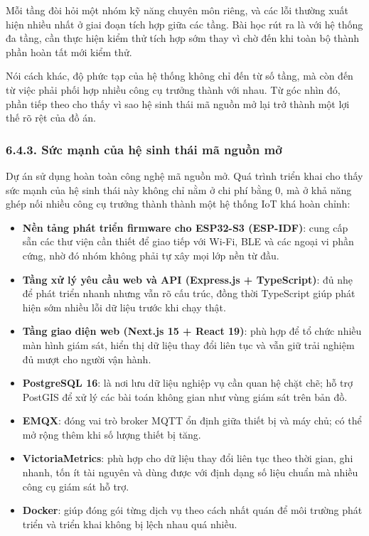 \documentclass[a4paper]{extarticle}
\providecommand{\tightlist}{%
  \setlength{\itemsep}{0pt}\setlength{\parskip}{0pt}}
\begin{document}
Mỗi tầng đòi hỏi một nhóm kỹ năng chuyên môn riêng, và các lỗi thường
xuất hiện nhiều nhất ở giai đoạn tích hợp giữa các tầng. Bài học rút ra
là với hệ thống đa tầng, cần thực hiện kiểm thử tích hợp sớm thay vì chờ
đến khi toàn bộ thành phần hoàn tất mới kiểm thử.

Nói cách khác, độ phức tạp của hệ thống không chỉ đến từ số tầng, mà còn
đến từ việc phải phối hợp nhiều công cụ trưởng thành với nhau. Từ góc
nhìn đó, phần tiếp theo cho thấy vì sao hệ sinh thái mã nguồn mở lại trở
thành một lợi thế rõ rệt của đồ án.

\subsubsection{6.4.3. Sức mạnh của hệ sinh thái mã nguồn
mở}\label{643-sux1ee9c-mux1ea1nh-cux1ee7a-hux1ec7-sinh-thuxe1i-muxe3-nguux1ed3n-mux1edf}

Dự án sử dụng hoàn toàn công nghệ mã nguồn mở. Quá trình triển khai cho
thấy sức mạnh của hệ sinh thái này không chỉ nằm ở chi phí bằng 0, mà ở
khả năng ghép nối nhiều công cụ trưởng thành thành một hệ thống IoT khá
hoàn chỉnh:

\begin{itemize}
\tightlist
\item
  \textbf{Nền tảng phát triển firmware cho ESP32-S3 (ESP-IDF)}: cung cấp
  sẵn các thư viện cần thiết để giao tiếp với Wi-Fi, BLE và các ngoại vi
  phần cứng, nhờ đó nhóm không phải tự xây mọi lớp nền từ đầu.
\item
  \textbf{Tầng xử lý yêu cầu web và API (Express.js + TypeScript)}: đủ
  nhẹ để phát triển nhanh nhưng vẫn rõ cấu trúc, đồng thời TypeScript
  giúp phát hiện sớm nhiều lỗi dữ liệu trước khi chạy thật.
\item
  \textbf{Tầng giao diện web (Next.js 15 + React 19)}: phù hợp để tổ
  chức nhiều màn hình giám sát, hiển thị dữ liệu thay đổi liên tục và
  vẫn giữ trải nghiệm đủ mượt cho người vận hành.
\item
  \textbf{PostgreSQL 16}: là nơi lưu dữ liệu nghiệp vụ cần quan hệ chặt
  chẽ; hỗ trợ PostGIS để xử lý các bài toán không gian như vùng giám sát
  trên bản đồ.
\item
  \textbf{EMQX}: đóng vai trò broker MQTT ổn định giữa thiết bị và máy
  chủ; có thể mở rộng thêm khi số lượng thiết bị tăng.
\item
  \textbf{VictoriaMetrics}: phù hợp cho dữ liệu thay đổi liên tục theo
  thời gian, ghi nhanh, tốn ít tài nguyên và dùng được với định dạng số
  liệu chuẩn mà nhiều công cụ giám sát hỗ trợ.
\item
  \textbf{Docker}: giúp đóng gói từng dịch vụ theo cách nhất quán để môi
  trường phát triển và triển khai không bị lệch nhau quá nhiều.
\end{itemize}
\end{document}
